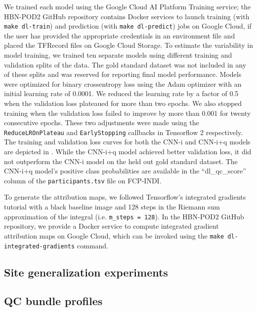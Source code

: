\documentclass[9pt,lineno]{elife}
\begin{document}
We trained each model using the Google Cloud AI Platform Training service;
the HBN-POD2 GitHub repository contains Docker services to launch training (with
\texttt{make dl-train}) and prediction (with \texttt{make dl-predict}) jobs on
Google Cloud, if the user has provided the appropriate credentials in an
environment file and placed the TFRecord files on Google Cloud Storage. To
estimate the variability in model training, we trained ten separate models using
different training and validation splits of the data. The gold standard dataset
was not included in any of these splits and was reserved for reporting final
model performance. Models were optimized for binary crossentropy loss using the
Adam optimizer \citep{kingma2017adam} with an initial learning rate of 0.0001. We
reduced the learning rate by a factor of 0.5 when the validation loss plateaued
for more than two epochs. We also stopped training when the validation loss
failed to improve by more than 0.001 for twenty consecutive epochs. These two
adjustments were made using the \texttt{ReduceLROnPlateau} and
\texttt{EarlyStopping} callbacks in Tensorflow 2 \citep{tensorflow} respectively.
The training and validation loss curves for both the CNN-i and CNN-i+q models
are depicted in . While the CNN-i+q model achieved
better validation loss, it did not outperform the CNN-i model on the held out
gold standard dataset. The CNN-i+q model's positive class probabilities are
available in the ``dl\_qc\_score'' column of the \texttt{participants.tsv} file on
FCP-INDI.

To generate the attribution maps, we followed Tensorflow's integrated gradients
tutorial \citep{integrated-gradients-tutorial} with a black baseline image and
128 steps in the Riemann sum approximation of the integral (i.e.
\texttt{m\_steps = 128}). In the HBN-POD2 GitHub repository, we provide a Docker
service to compute integrated gradient attribution maps on Google Cloud, which
can be invoked using the \texttt{make dl-integrated-gradients} command.

\subsection{Site generalization experiments}


\subsection{QC bundle profiles}
\end{document}
